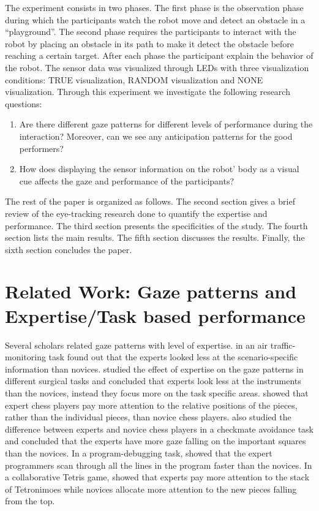 \documentclass{sig-alternate}
\begin{document}
The experiment consists in two phases. The first phase is the observation phase
during which the participants watch the robot move and detect an obstacle in a
``playground''. The second phase requires the participants to interact with the
robot by placing an obstacle in its path to make it detect the obstacle before
reaching a certain target.  After each phase the participant explain the
behavior of the robot. The sensor data was visualized through LEDs with three
visualization conditions: {\sf TRUE} visualization, {\sf RANDOM} visualization and {\sf NONE}
visualization. Through this experiment we investigate the following research
questions:

\begin{enumerate}
    \item Are there different gaze patterns for different levels of performance
during the interaction? Moreover, can we see any anticipation patterns
for the good performers?

    \item How does displaying the sensor information on the robot' body as a
visual cue affects the gaze and performance of the participants?
\end{enumerate}

The rest of the paper is organized as follows. The second section gives
a brief review of the eye-tracking research done to quantify the
expertise and performance. The third section presents the specificities
of the study. The fourth section lists the main results. The fifth
section discusses the results. Finally, the sixth section concludes the
paper.


\section{Related Work: Gaze patterns and Expertise/Task based performance}

Several scholars related gaze patterns with level of expertise.
\cite{hasse2012measure} in an air traffic-monitoring task found out that the
experts looked less at the scenario-specific information than novices.
\cite{eivazi2012gaze, law2004eye, tien2010measuring} studied the effect of
expertise on the gaze patterns in different surgical tasks and concluded that
experts look less at the instruments than the novices, instead they focus more
on the task specific areas. \cite{reingold2001visual} showed that expert chess
players pay more attention to the relative positions of the pieces, rather than
the individual pieces, than novice chess players. \cite{blignaut2008visual} also
studied the difference between experts and novice chess players in a checkmate
avoidance task and concluded that the experts have more gaze falling on the
important squares than the novices. In a program-debugging task,
\cite{sharif2012eye} showed that the expert programmers scan through all the
lines in the program faster than the novices. In a collaborative Tetris game,
\cite{jermann2010using} showed that experts pay more attention to the stack of
Tetronimoes while novices allocate more attention to the new pieces falling from
the top.
\end{document}
